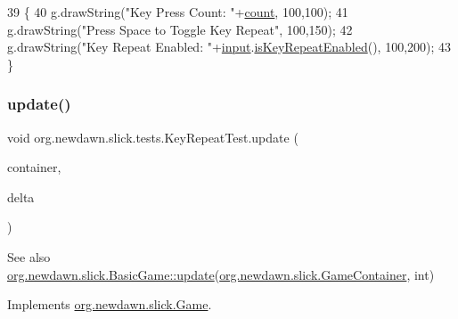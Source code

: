 \begin{DoxyCode}
39                                                             \{
40         g.drawString(\textcolor{stringliteral}{"Key Press Count: "}+\mbox{\hyperlink{classorg_1_1newdawn_1_1slick_1_1tests_1_1_key_repeat_test_a907835f32f42f9cf166da563119cff0b}{count}}, 100,100);
41         g.drawString(\textcolor{stringliteral}{"Press Space to Toggle Key Repeat"}, 100,150);
42         g.drawString(\textcolor{stringliteral}{"Key Repeat Enabled: "}+\mbox{\hyperlink{classorg_1_1newdawn_1_1slick_1_1tests_1_1_key_repeat_test_ae6cb084c8595eb389b674bce147bd4ea}{input}}.\mbox{\hyperlink{classorg_1_1newdawn_1_1slick_1_1_input_a81051ce61287d26d30ee47a0af2a08eb}{isKeyRepeatEnabled}}(), 100,200);
43     \}
\end{DoxyCode}
\mbox{\label{classorg_1_1newdawn_1_1slick_1_1tests_1_1_key_repeat_test_a4d6ab0932627780f42f23837e9e70527}} 
\subsubsection{\texorpdfstring{update()}{update()}}
{\footnotesize\ttfamily void org.\+newdawn.\+slick.\+tests.\+Key\+Repeat\+Test.\+update (\begin{DoxyParamCaption}\item[{\mbox{\hyperlink{classorg_1_1newdawn_1_1slick_1_1_game_container}{Game\+Container}}}]{container,  }\item[{int}]{delta }\end{DoxyParamCaption})\hspace{0.3cm}{\ttfamily [inline]}}

\begin{DoxySeeAlso}{See also}
\mbox{\hyperlink{classorg_1_1newdawn_1_1slick_1_1_basic_game_acfe6fa05aef83bff1631af91a3e4bd20}{org.\+newdawn.\+slick.\+Basic\+Game\+::update}}(\mbox{\hyperlink{classorg_1_1newdawn_1_1slick_1_1_game_container}{org.\+newdawn.\+slick.\+Game\+Container}}, int) 
\end{DoxySeeAlso}


Implements \mbox{\hyperlink{interfaceorg_1_1newdawn_1_1slick_1_1_game_ab07b2e9463ee4631620dde0de25bdee8}{org.\+newdawn.\+slick.\+Game}}.


